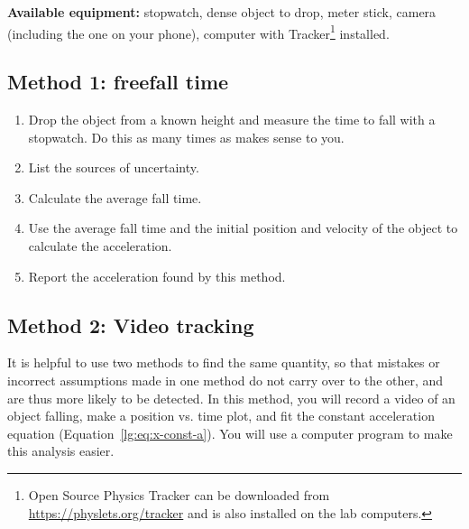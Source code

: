 
\textbf{Available equipment:} stopwatch, dense object to drop, meter stick, camera (including the one on your phone), computer with Tracker\footnote{Open Source Physics Tracker can be downloaded from \url{https://physlets.org/tracker} and is also installed on the lab computers.} installed.

\subsection{Method 1: freefall time}

\begin{enumerate}
	\item Drop the object from a known height and measure the time to fall with a stopwatch. Do this as many times as makes sense to you.
	
	\item List the sources of uncertainty.%
	
	\item Calculate the average fall time.
	
	
	\item Use the average fall time and the initial position and velocity of the object to calculate the acceleration.
	
	
	\item Report the acceleration found by this method.%
\end{enumerate}

\subsection{Method 2: Video tracking}

It is helpful to use two methods to find the same quantity, so that mistakes or incorrect assumptions made in one method do not carry over to the other, and are thus more likely to be detected. In this method, you will record a video of an object falling, make a position vs. time plot, and fit the constant acceleration equation (Equation~\ref{lg:eq:x-const-a}). You will use a computer program to make this analysis easier.

